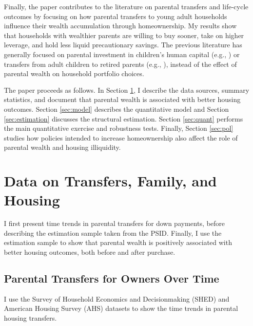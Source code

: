 \documentclass[12pt]{article}
\begin{document}
Finally, the paper contributes to the literature on parental transfers and life-cycle outcomes by focusing on how parental transfers to young adult households influence their wealth accumulation through homeownership. My results show that households with wealthier parents are willing to buy sooner, take on higher leverage, and hold less liquid precautionary savings. The previous literature has generally focused on parental investment in children's human capital (e.g., \citealp{Lee2019,Daruich2018,gilraine2023public}) or transfers from adult children to retired parents (e.g., \citealp{Mommaerts2016, Barczyk2018, Barczyk2020a}), instead of the effect of parental wealth on household portfolio choices. 

The paper proceeds as follows. In Section \ref{sec:data}, I describe the data sources, summary statistics, and document that parental wealth is associated with better housing outcomes. Section \ref{sec:model} describes the quantitative model and Section \ref{sec:estimation} discusses the structural estimation. Section \ref{sec:quant} performs the main quantitative exercise and robustness tests. Finally, Section \ref{sec:pol} studies how policies intended to increase homeownership also affect the role of parental wealth and housing illiquidity.

\section{Data on Transfers, Family, and Housing}\label{sec:data}
I first present time trends in parental transfers for down payments, before describing the estimation sample taken from the PSID. Finally, I use the estimation sample to show that parental wealth is positively associated with better housing outcomes, both before and after purchase.

\subsection{Parental Transfers for Owners Over Time}\label{sec:overtime}
I use the Survey of Household Economics and Decisionmaking (SHED) and American Housing Survey (AHS) datasets to show the time trends in parental housing transfers.
\end{document}
